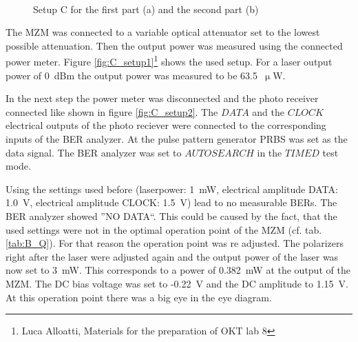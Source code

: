 \begin{adjustwidth}{-2cm}{2cm}
\begin{figure}%
\centering
	~~~~~~~~~
\caption{Setup C for the first part (a) and the second part (b)}%
\label{fig:13_42}%
\end{figure}
\end{adjustwidth}



The MZM was connected to a variable optical attenuator set to the lowest possible attenuation. Then the output power was measured using the connected power meter. Figure \ref{fig:C_setup1}\footnote[3]{Luca Alloatti, Materials for the preparation of OKT lab 8} shows the used setup. For a laser output power of 0~dBm the output power was measured to be 63.5~$\upmu$W.

In the next step the power meter was disconnected and the photo receiver connected like shown in figure \ref{fig:C_setup2}\footnotemark[3]. The $DATA$ and the $CLOCK$ electrical outputs of the photo reciever were connected to the corresponding inputs of the BER analyzer. At the pulse pattern generator PRBS was set as the data signal. The BER analyzer was set to $AUTOSEARCH$ in the $TIMED$ test mode. 






Using the settings used before (laserpower: 1~mW, electrical amplitude DATA: 1.0~V, electrical amplitude CLOCK: 1.5~V) lead to no measurable BERs. The BER analyzer showed ''NO DATA``. This could be caused by the fact, that the used settings were not in the optimal operation point of the MZM (cf. tab. \ref{tab:B_Q}). For that reason the operation point was re adjusted. The polarizers right after the laser were adjusted again and the output power of the laser was now set to 3~mW. This corresponds to a power of 0.382~mW at the output of the MZM. The DC bias voltage was set to -0.22~V and the DC amplitude to 1.15~V. At this operation point there was a big eye in the eye diagram.

